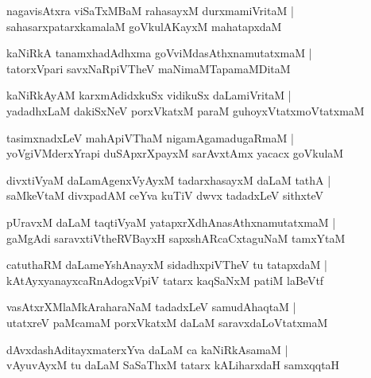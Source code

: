 \documentclass[twoside,12pt,openright]{book}
\newcounter{shloka}[chapter]
\begin{document}
\begin{shloka}%
nagavisAtxra viSaTxMBaM rahasayxM durxmamiVritaM |\\
sahasarxpatarxkamalaM goVkulAKayxM mahatapxdaM 
\end{shloka}

\begin{shloka}%
kaNiRkA tanamxhadAdhxma goVviMdasAthxnamutatxmaM |\\
tatorxVpari savxNaRpiVTheV maNimaMTapamaMDitaM 
\end{shloka}

\begin{shloka}%
kaNiRkAyAM karxmAdidxkuSx vidikuSx daLamiVritaM |\\
yadadhxLaM dakiSxNeV porxVkatxM paraM guhoyxVtatxmoVtatxmaM 
\end{shloka}

\begin{shloka}%
tasimxnadxLeV mahApiVThaM nigamAgamadugaRmaM |\\
yoVgiVMderxYrapi duSApxrXpayxM sarAvxtAmx yacacx goVkulaM 
\end{shloka}

\begin{shloka}%
divxtiVyaM daLamAgenxVyAyxM  tadarxhasayxM daLaM tathA |\\
saMkeVtaM divxpadAM ceYva kuTiV dwvx tadadxLeV sithxteV 
\end{shloka}

\begin{shloka}%
pUravxM daLaM taqtiVyaM yatapxrXdhAnasAthxnamutatxmaM |\\
gaMgAdi saravxtiVtheRVBayxH sapxshARcaCxtaguNaM tamxYtaM
\end{shloka}

\begin{shloka}%
catuthaRM daLameYshAnayxM sidadhxpiVTheV tu tatapxdaM |\\
kAtAyxyanayxcaRnAdogxVpiV tatarx kaqSaNxM patiM laBeVtf 
\end{shloka}

\begin{shloka}%
vasAtxrXMlaMkAraharaNaM tadadxLeV samudAhaqtaM |\\
utatxreV paMcamaM porxVkatxM daLaM saravxdaLoVtatxmaM 
\end{shloka}

\begin{shloka}%
dAvxdashAditayxmaterxYva daLaM ca kaNiRkAsamaM |\\
vAyuvAyxM tu daLaM SaSaThxM tatarx kALiharxdaH samxqqtaH 
\end{shloka}
\end{document}
